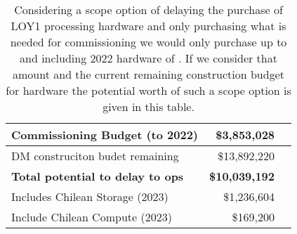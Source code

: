 \tiny \begin{longtable} { |p{}  |r  |r |} 
\caption{Considering a scope option of delaying the purchase of LOY1 processing hardware and only purchasing what is needed for commissioning we would only purchase up to and including 2022 hardware of . If we consider that amount and the current remaining construction budget for hardware the potential worth of such a scope option is given in this table. \label{tab:Scope}}\\ 
\hline 
\textbf{Commissioning Budget (to 2022)  }&\textbf{\$3,853,028} \\ \hline
{DM construciton budet remaining}&{\$13,892,220} \\ \hline
\textbf{Total potential to delay to ops }&\textbf{\$10,039,192} \\ \hline
{Includes Chilean Storage (2023)}&{\$1,236,604} \\ \hline
{Include Chilean Compute (2023)}&{\$169,200} \\ \hline
\end{longtable} \normalsize

